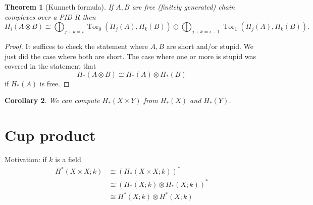 \documentclass[10pt,]{book}
\theoremstyle{plain}
\newtheorem{theorem}{Theorem}[section]
\newtheorem{corollary}[theorem]{Corollary}
\theoremstyle{definition}
\numberwithin{equation}{section}
\DeclareMathOperator{\Tor}{Tor}
\begin{document}
\begin{theorem}[Kunneth formula]\label{theorem-4}
If \(A,B\) are free (finitely generated) chain complexes over a PID \(R\) then
            \[H_i(A\otimes B) \cong \bigoplus_{j + k = i} \Tor_0(H_j(A), H_k(B)) \oplus\bigoplus_{j+k = i-1} \Tor_1(H_j(A), H_k(B)).\]\end{theorem}
\begin{proof}
It suffices to check the statement where \(A,B\) are short and/or stupid.
            We just did the case where both are short.
            The case where one or more is stupid was covered in the statement that
            \[H_*(A\otimes B) \cong H_*(A) \otimes H_*(B)\]
            if \(H_*(A)\) is free.
          \end{proof}
\begin{corollary}\label{corollary-10}
We can compute \(H_*(X\times Y)\) from \(H_*(X)\) and \(H_*(Y)\).\end{corollary}
\typeout{************************************************}
\typeout{************************************************}
\section[Cup product]{Cup product}\label{sec-cup-product}
Motivation: if \(k\) is a field
          \begin{align*}
H^*(X\times X; k) &\cong (H_*(X\times X; k))^*\\
 &\cong (H_*(X; k)\otimes H_*(X; k))^*\\
 &\cong H^*(X; k)\otimes H^*(X; k)
\end{align*}
          
\end{document}
